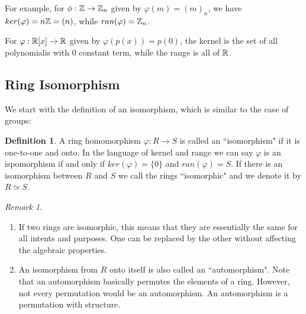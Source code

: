 \documentclass[12pt]{article}
\theoremstyle{plain}
\theoremstyle{definition}
\newtheorem{definition}{Definition}
\theoremstyle{remark}
\newtheorem{remark}{Remark}
\begin{document}
For example, for $\phi:\mathbb{Z} \rightarrow \mathbb{Z}_n$ given by $\varphi(m)=(m)_n$, we have $ker(\varphi) = n\mathbb{Z} = (n)$, while $ran(\varphi) = \mathbb{Z}_n$.

For $\varphi:\mathbb{R}[x]\rightarrow \mathbb{R}$ given by $\varphi(p(x))=p(0)$, the kernel is the set of all polynomialis with $0$ constant term, while the range is all of $\mathbb{R}$.

\subsection{Ring Isomorphism}
We start with the definition of an isomorphism, which is similar to the case of groups:
\begin{definition}
A ring homomorphism $\varphi:R\rightarrow S$ is called an ``isomorphism" if it is one-to-one and onto. In the language of kernel and range we can say $\varphi$ is an ispomorphism if and only if $ker(\varphi)=\{0\}$ and $ran(\varphi)=S$. 
 If there is an isomorphism between $R$ and $S$ we call the rings ``isomorphic" and we denote it by $R\simeq S$.
\end{definition}
\begin{remark}
\begin{enumerate}
    \item If two rings are isomorphic, this means that they are essentially the same for all intents and purposes. One can be replaced by the other without affecting the algebraic properties. 
    \item An isomorphism from $R$ onto itself is also called an ``automorphism". Note that an automorphism basically permutes the elements of a ring. However, not every permutation would be an automorphism. An automorphism is a permutation with structure. 
\end{enumerate}
\end{remark}
\end{document}

